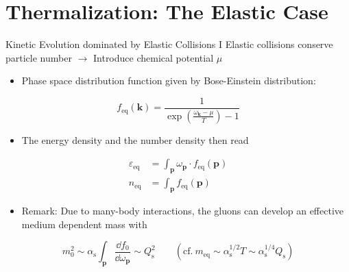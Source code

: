 \section{Thermalization: The Elastic Case}

\begin{frame}{Kinetic Evolution dominated by Elastic Collisions I}
\vspace{0.5em}
Elastic collisions conserve \alert{particle number} $\longrightarrow$ Introduce chemical potential $\mu$\\[0.5em]

\begin{itemize}
	\item Phase space distribution function given by \alert{Bose-Einstein distribution}:
\end{itemize}
\begin{equation}
	f_{\mathrm{eq}}(\mathbf{k}) = \frac{1}{\exp(\frac{\omega_{\mathbf{k}}-\mu}{T}) - 1}
\end{equation}

\begin{itemize}
	\item The energy density and the number density then read
\end{itemize}
\begin{align}
	\varepsilon_{\mathrm{eq}} &=\int_{\mathbf{p}} \omega_{\mathbf{p}}\cdot f_{\mathrm{eq}}(\mathbf{p}) \\
	n_{\mathrm{eq}} &= \int_{\mathbf{p}} 	f_{\mathrm{eq}}(\mathbf{p})
\end{align}
\begin{itemize}
	\item \alert{Remark:} Due to many-body interactions, the gluons can develop an effective medium dependent mass with 
\end{itemize}
\begin{equation}
	m_0^2 \sim \alpha_{\mathrm{s}}\int_{\mathbf{p}}\frac{\dd f_0}{\dd\omega_{\mathbf{p}}} \sim Q_{\mathrm{s}}^2 \qquad (\text{cf.}\ m_{\mathrm{eq}}\sim \alpha_{\mathrm{s}}^{1/2}T \sim \alpha_{\mathrm{s}}^{1/4}Q_{\mathrm{s}})
\end{equation}\label{eqn:bose-einstein}
\end{frame}

